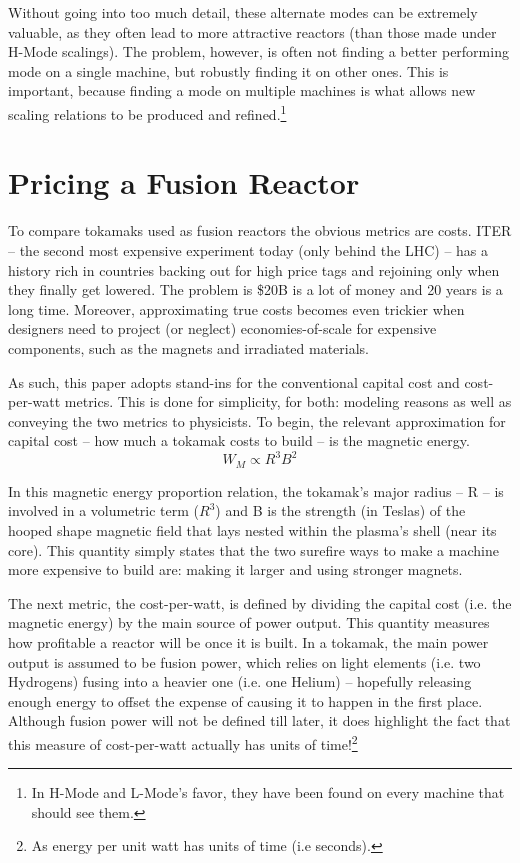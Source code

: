 Without going into too much detail, these alternate modes can be extremely valuable, as they often lead to more attractive reactors (than those made under H-Mode scalings). The problem, however, is often not finding a better performing mode on a single machine, but robustly finding it on other ones. This is important, because finding a mode on multiple machines is what allows new scaling relations to be produced and refined.\footnote{ In H-Mode and L-Mode's favor, they have been found on every machine that should see them. }

\section{Pricing a Fusion Reactor}

To compare tokamaks used as fusion reactors the obvious metrics are costs. ITER -- the second most expensive experiment today (only behind the LHC) -- has a history rich in countries backing out for high price tags and rejoining only when they finally get lowered. \cite{jeff} The problem is \$20B is a lot of money and 20 years is a long time. Moreover, approximating true costs becomes even trickier when designers need to project (or neglect)  economies-of-scale for expensive components, such as the magnets and irradiated materials.

As such, this paper adopts stand-ins for the conventional capital cost and cost-per-watt metrics. This is done for simplicity, for both: modeling reasons as well as conveying the two metrics to physicists. To begin, the relevant approximation for capital cost -- how much a tokamak costs to build -- is the magnetic energy. \cite{griffiths}
\begin{equation}
	W_M \propto R^3 B^2
\end{equation}

In this magnetic energy proportion relation, the tokamak's major radius -- R -- is involved in a volumetric term ($R^3$) and B is the strength (in Teslas) of the hooped shape magnetic field that lays nested within the plasma's shell (near its core). This quantity simply states that the two surefire ways to make a machine more expensive to build are: making it larger and using stronger magnets.

The next metric, the cost-per-watt, is defined by dividing the capital cost (i.e. the magnetic energy) by the main source of power output. This quantity measures how profitable a reactor will be once it is built. In a tokamak, the main power output is assumed to be fusion power, which relies on light elements (i.e. two Hydrogens) fusing into a heavier one (i.e. one Helium) -- hopefully releasing enough energy to offset the expense of causing it to happen in the first place. Although fusion power will not be defined till later, it does highlight the fact that this measure of cost-per-watt actually has units of time!\footnote{As energy per unit watt has units of time (i.e seconds).}

